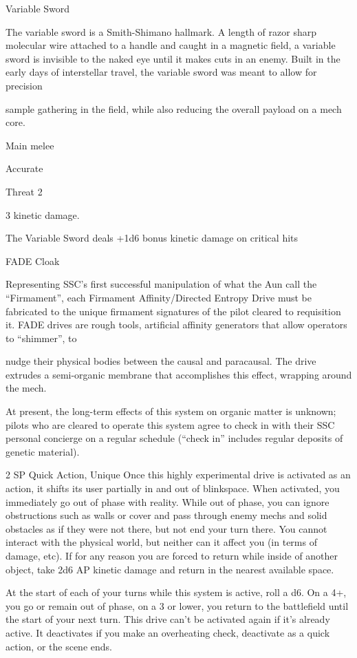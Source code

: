 Variable Sword

The variable sword is a Smith-Shimano hallmark. A length of razor sharp molecular wire attached to a
handle and caught in a magnetic field, a variable sword is invisible to the naked eye until it makes cuts in an
enemy. Built in the early days of interstellar travel, the variable sword was meant to allow for precision

sample gathering in the field, while also reducing the overall payload on a mech core.

Main melee

Accurate

Threat 2

3 kinetic damage.

The Variable Sword deals +1d6 bonus kinetic damage on critical hits


FADE Cloak




Representing SSC’s first successful manipulation of what the Aun call the “Firmament”, each Firmament
Affinity/Directed Entropy Drive must be fabricated to the unique firmament signatures of the pilot cleared to
requisition it. FADE drives are rough tools, artificial affinity generators that allow operators to “shimmer”, to

nudge their physical bodies between the causal and paracausal. The drive extrudes a semi-organic
membrane that accomplishes this effect, wrapping around the mech.

At present, the long-term effects of this system on organic matter is unknown; pilots who are cleared to
operate this system agree to check in with their SSC personal concierge on a regular schedule (“check in”
includes regular deposits of genetic material).

2 SP
Quick Action, Unique
Once this highly experimental drive is activated as an action, it shifts its user partially in and out
of blinkspace. When activated, you immediately go out of phase with reality. While out of phase,
you can ignore obstructions such as walls or cover and pass through enemy mechs and solid
obstacles as if they were not there, but not end your turn there. You cannot interact with the
physical world, but neither can it affect you (in terms of damage, etc). If for any reason you are
forced to return while inside of another object, take 2d6 AP kinetic damage and return in the
nearest available space.


At the start of each of your turns while this system is active, roll a d6. On a 4+, you go or remain
out of phase, on a 3 or lower, you return to the battlefield until the start of your next turn. This
drive can’t be activated again if it’s already active. It deactivates if you make an overheating
check, deactivate as a quick action, or the scene ends.
